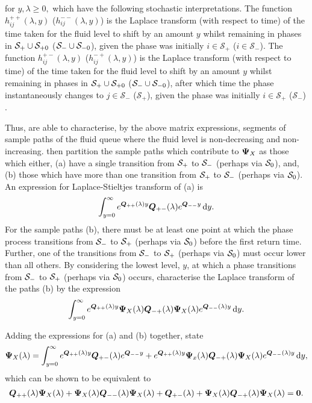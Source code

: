 for \(y,\lambda\geq 0,\) which have the following stochastic interpretations. The function \(h_{ij}^{++}(\lambda,y)\) (\(h_{ij}^{--}(\lambda,y)\)) is the Laplace transform (with respect to time) of the time taken for the fluid level to shift by an amount \(y\) whilst remaining in phases in \(\mathcal S_+\cup\mathcal{S}_{+0}\) (\(\mathcal S_-\cup\mathcal{S}_{-0}\)), given the phase was initially \(i\in\mathcal S_+\) (\(i\in\mathcal S_-\)). The function \(h_{ij}^{+-}(\lambda,y)\) (\(h_{ij}^{-+}(\lambda,y)\)) is the Laplace transform (with respect to time) of the time taken for the fluid level to shift by an amount \(y\) whilst remaining in phases in \(\mathcal S_+\cup\mathcal{S}_{+0}\) (\(\mathcal S_-\cup\mathcal{S}_{-0}\)), after which time the phase instantaneously changes to \(j\in\mathcal S_-\) (\(\mathcal S_+\)), given the phase was initially \(i\in\mathcal S_+\) (\(\mathcal S_-\)) \citep{bean2005}.

Thus, \cite{bean2005} are able to characterise, by the above matrix expressions, segments of sample paths of the fluid queue where the fluid level is non-decreasing and non-increasing. \cite{bean2005} then partition the sample paths which contribute to \(\boldsymbol \Psi_X\) as those which either, (a) have a single transition from \(\mathcal{S}_+\) to \(\mathcal{S}_-\) (perhaps via \(\mathcal{S}_0\)), and, (b) those which have more than one transition from \(\mathcal{S}_+\) to \(\mathcal{S}_-\) (perhaps via \(\mathcal{S}_0\)). An expression for Laplace-Stieltjes transform of (a) is 
\[\int_{y=0}^\infty e^{\boldsymbol Q_{++}(\lambda)y}\boldsymbol Q_{+-}(\lambda)e^{\boldsymbol Q_{--}y}\, \mathrm{d} y.\]
For the sample paths (b), there must be at least one point at which the phase process transitions from \(\mathcal{S}_-\) to \(\mathcal{S}_+\) (perhaps via \(\mathcal{S}_0\)) before the first return time. Further, one of the transitions from \(\mathcal{S}_-\) to \(\mathcal{S}_+\) (perhaps via \(\mathcal{S}_0\)) must occur lower than all others. By considering the lowest level, \(y\), at which a phase transitions from \(\mathcal{S}_-\) to \(\mathcal{S}_+\) (perhaps via \(\mathcal{S}_0\)) occurs, \cite{bean2005} characterise the Laplace transform of the paths (b) by the expression 
\begin{align}
	\int_{y=0}^\infty e^{\boldsymbol Q_{++}(\lambda)y} \boldsymbol \Psi_X(\lambda)\boldsymbol Q_{-+}(\lambda)\boldsymbol \Psi_X(\lambda) e^{\boldsymbol Q_{--}(\lambda)y}\, \mathrm{d} y.
\end{align}

Adding the expressions for (a) and (b) together, \cite{bean2005} state 
\begin{align}
	\boldsymbol \Psi_X(\lambda) = \int_{y=0}^\infty e^{\boldsymbol Q_{++}(\lambda)y}\boldsymbol Q_{+-}(\lambda)e^{\boldsymbol Q_{--}y} + e^{\boldsymbol Q_{++}(\lambda)y} \boldsymbol \Psi_x(\lambda)\boldsymbol Q_{-+}(\lambda)\boldsymbol \Psi_X(\lambda) e^{\boldsymbol Q_{--}(\lambda)y}\, \mathrm{d} y,
\end{align}
which can be shown to be equivalent to \citep[Lemma~3 and Theorem~9.2]{br1997}
\begin{align}
	\boldsymbol Q_{++}(\lambda)\boldsymbol \Psi_X(\lambda) + \boldsymbol \Psi_X(\lambda)\boldsymbol Q_{--}(\lambda)\boldsymbol \Psi_X(\lambda) + \boldsymbol Q_{+-}(\lambda) + \boldsymbol \Psi_X(\lambda)\boldsymbol Q_{-+}(\lambda)\boldsymbol \Psi_X(\lambda) = \boldsymbol 0.
\end{align}

